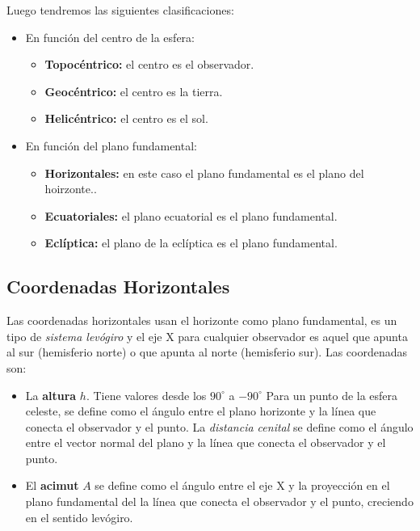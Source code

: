 Luego tendremos las siguientes clasificaciones:
\begin{itemize}
	\item En función del centro de la esfera: \begin{itemize}
		      \item \textbf{Topocéntrico:} el centro es el observador.
		      \item \textbf{Geocéntrico:} el centro es la tierra.
		      \item \textbf{Helicéntrico:} el centro es el sol.
	      \end{itemize}
	\item En función del plano fundamental: \begin{itemize}
		      \item \textbf{Horizontales:} en este caso el plano fundamental es el {plano del hoirzonte.}.
		      \item \textbf{Ecuatoriales:} el plano ecuatorial es el plano fundamental.
		      \item \textbf{Eclíptica:} el plano de la eclíptica es el plano fundamental.
	      \end{itemize}
\end{itemize}

\subsection{Coordenadas Horizontales}

Las coordenadas horizontales usan el horizonte como plano fundamental, es un tipo de \textit{sistema levógiro} y el eje X para cualquier observador es aquel que apunta al sur (hemisferio norte) o que apunta al norte (hemisferio sur). Las coordenadas son:

\begin{itemize}
	\item La \textbf{altura} $h$. Tiene valores desde los $90^\circ$ a $-90^\circ$ Para un punto de la esfera celeste, se define como el ángulo entre el plano horizonte y la línea que conecta el observador y el punto. La \textit{distancia cenital} se define como el ángulo entre el vector normal del plano y la línea que conecta el observador y el punto.
	\item El \textbf{acimut} $A$ se define como el ángulo entre el eje X y la proyección en el plano fundamental del la línea que conecta el observador y el punto, creciendo en el sentido levógiro.
\end{itemize}

